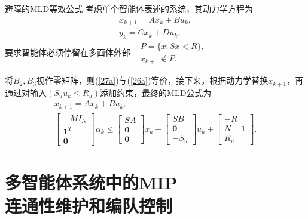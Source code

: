 \documentclass[notheorems,11pt]{beamer}
\theoremstyle{plain}
\numberwithin{theorem}{section}
\numberwithin{lemma}{section}
\numberwithin{corollary}{section}
\theoremstyle{example}
\begin{document}
\begin{frame}{避障的MLD等效公式}
  考虑单个智能体表述的系统，其动力学方程为
  \begin{subequations}
    \begin{gather}
      x_{k+1}=Ax_k+Bu_k ,\label{27a}\\
      y_k=Cx_k+Du_k.\label{27b}
    \end{gather}
  \end{subequations}
  要求智能体必须停留在多面体外部$\begin{aligned}
    &P=\{x:Sx<R\} ,\\
    &x_{k+1}\notin P.
  \end{aligned}$\par
  将$B_2,B_3$视作零矩阵，则(\ref{27a})与(\ref{26a})等价，接下来，根据动力学替换$x_{k+1}$，再通过对输入$(S_uu_k\leqslant R_u)$添加约束，最终的MLD公式为
  \begin{subequations}
  \begin{gather}
    x_{k+1}=Ax_k+Bu_k ,\label{29a}\\
    \left[\begin{gathered}
      -MI_N \\
      \mathbf{1}^T \\
      \mathbf{0}
    \end{gathered}\right]\alpha_k\leqslant \left[\begin{gathered}
      SA \\
      \mathbf{0} \\
      \mathbf{0}
    \end{gathered}\right]x_k+\left[\begin{gathered}
      SB \\
      \mathbf{0} \\
      -S_u
    \end{gathered}\right]u_k+\left[\begin{gathered}
      -R \\
      N-1 \\
      R_u
    \end{gathered}\right].
  \end{gather}
  \end{subequations}
\end{frame}

\section{多智能体系统中的MIP\\连通性维护和编队控制}
\end{document}
